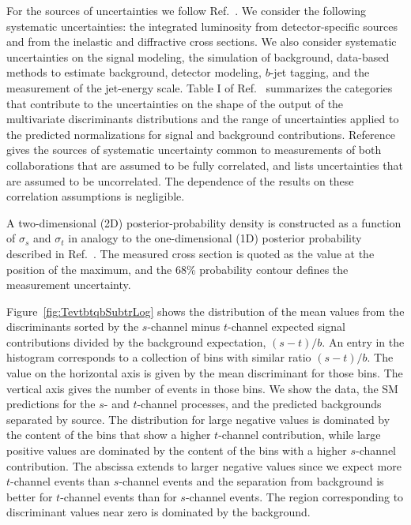 \documentclass[aps,prl,twocolumn,showpacs,superscriptaddress,groupedaddress]{revtex4}  %
\begin{document}

For the sources of uncertainties we follow Ref.~\cite{tev_schannel}.
We consider the following systematic uncertainties: the integrated
luminosity from detector-specific sources and from the inelastic and
diffractive cross sections.  We also consider systematic uncertainties
on the signal modeling, the simulation of background, data-based
methods to estimate background, detector modeling, $b$-jet tagging, and the
measurement of the jet-energy scale. Table I of
Ref.~\cite{tev_schannel} summarizes the categories that contribute to
the uncertainties on the shape of the output of the multivariate
discriminants distributions and the range of uncertainties applied to
the predicted normalizations for signal and background contributions.
Reference~\cite{tev_schannel} gives the sources of systematic
uncertainty common to measurements of both collaborations that are
assumed to be fully correlated, and lists uncertainties that are
assumed to be uncorrelated. The dependence of the results on these
correlation assumptions is negligible. 

A two-dimensional (2D) posterior-probability density is constructed as
a function of $\sigma_s$ and $\sigma_t$ in analogy to the
one-dimensional (1D) posterior probability described in Ref.~\cite{tev_schannel}. 
The measured cross section is quoted as the value at the position of
the maximum, and the 68\% probability contour defines the measurement
uncertainty.  





Figure~\ref{fig:TevtbtqbSubtrLog} shows the distribution of the
mean values from the discriminants sorted by the $s$-channel minus
$t$-channel expected signal contributions divided by the background 
expectation, $(s-t)/b$. An entry in the histogram corresponds to a
collection of bins with similar ratio $(s-t)/b$. The value on the
horizontal axis is given by the mean discriminant for those bins. The
vertical axis gives the number of events in those bins.
We show the data, the SM predictions for the $s$-  and
$t$-channel processes, and the predicted backgrounds separated by
source. 
The distribution for large negative values is dominated by the content
of the bins that show a higher $t$-channel contribution, while large
positive values are dominated by the content of the bins with a higher
$s$-channel contribution. The abscissa extends to larger negative
values since we expect more $t$-channel events than $s$-channel events
and the separation from background is better for $t$-channel events
than for $s$-channel events. The region corresponding to discriminant
values near zero is dominated by the background. 
\end{document}
